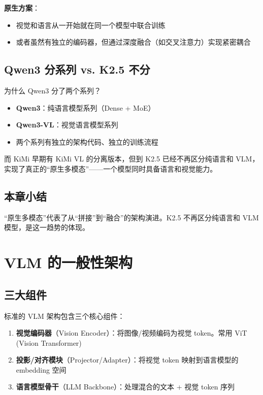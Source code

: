 \documentclass[a4paper]{article}
\begin{document}
\textbf{原生方案}：
\begin{itemize}
  \item 视觉和语言从一开始就在同一个模型中联合训练
  \item 或者虽然有独立的编码器，但通过深度融合（如交叉注意力）实现紧密耦合
\end{itemize}

\subsection{Qwen3 分系列 vs. K2.5 不分}

\begin{knowledgebox}{为什么 Qwen3 分了两个系列？}
\begin{itemize}
  \item \textbf{Qwen3}：纯语言模型系列（Dense + MoE）
  \item \textbf{Qwen3-VL}：视觉语言模型系列
  \item 两个系列有独立的架构代码、独立的训练流程
\end{itemize}
而 KiMi 早期有 KiMi VL 的分离版本，但到 K2.5 已经不再区分纯语言和 VLM，实现了真正的``原生多模态''——一个模型同时具备语言和视觉能力。
\end{knowledgebox}

\subsection{本章小结}

``原生多模态''代表了从``拼接''到``融合''的架构演进。K2.5 不再区分纯语言和 VLM 模型，是这一趋势的体现。

\section{VLM 的一般性架构}

\subsection{三大组件}

标准的 VLM 架构包含三个核心组件：

\begin{enumerate}
  \item \textbf{视觉编码器}（Vision Encoder）：将图像/视频编码为视觉 token。常用 ViT (Vision Transformer)
  \item \textbf{投影/对齐模块}（Projector/Adapter）：将视觉 token 映射到语言模型的 embedding 空间
  \item \textbf{语言模型骨干}（LLM Backbone）：处理混合的文本 + 视觉 token 序列
\end{enumerate}
\end{document}
